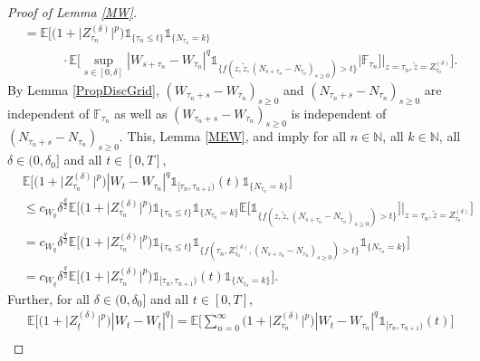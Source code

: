 \documentclass[11pt,a4paper]{article}
\numberwithin{equation}{section}
\theoremstyle{definition}
\newcommand{\E}{{\mathbb{E}}}
\newcommand{\N}{{\mathbb{N}}}
\newcommand{\F}{\mathbb{F}}
\begin{document}
\begin{proof}[Proof of Lemma \ref{MW}]
\begin{equation}
\begin{aligned}
    &= \E\Big[\big(1+ \big|Z^{(\delta)}_{\tau_n}\big|^p\big) \mathds{1}_{\{\tau_n \leq t\}} \mathds{1}_{\{N_{\tau_n} = k\}} \\
    &\quad\quad\quad \cdot\E\Big[ \sup_{s\in[0,\delta]} |W_{s+\tau_n}-W_{\tau_n}|^q  \mathds{1}_{\{f(z,\widetilde z, (N_{s+\tau_n}-N_{\tau_n})_{s\geq 0})> t\}}  \Big| \F_{\tau_n} \Big]\Big|_{z =\tau_n, \widetilde z =Z^{(\delta)}_{\tau_n} } \Big].
    \end{aligned}
\end{equation}
By Lemma \ref{PropDiscGrid}, $(W_{\tau_n+s}- W_{\tau_n})_{s\geq 0}$ and $(N_{\tau_n+s}- N_{\tau_n})_{s\geq 0}$ are independent of $\F_{\tau_n}$ as well as $(W_{\tau_n+s}- W_{\tau_n})_{s\geq 0}$ is independent of $(N_{\tau_n+s}- N_{\tau_n})_{s\geq 0}$. This, Lemma \ref{MEW}, and \cite[p.~33]{Grikhman2004} imply for all $n\in\N$, all $k\in\N$, all $\delta\in(0,\delta_0]$ and all $t\in[0,T]$,
\begin{equation}
    \begin{aligned}\label{MW4a}
    &\E\big[\big(1+ \big|Z^{(\delta)}_{\tau_n}\big|^p\big)   |W_t-W_{\tau_n}|^q \mathds{1}_{[\tau_n,\tau_{n+1})}(t)  \mathds{1}_{\{N_{\tau_n} = k\}} \big]\\
    &\leq c_{W_q} \delta^\frac{q}{2} \E\Big[\big(1+ \big|Z^{(\delta)}_{\tau_n}\big|^p\big) \mathds{1}_{\{\tau_n \leq t\}} \mathds{1}_{\{N_{\tau_n} = k\}} \E\Big[ \mathds{1}_{\{f(z,\widetilde z, (N_{s+\tau_n}-N_{\tau_n})_{s\geq0})> t\}} \Big]\Big|_{z =\tau_n, \widetilde z =Z^{(\delta)}_{\tau_n}} \Big]\\
    &= c_{W_q} \delta^\frac{q}{2} \E\Big[\big(1+ \big|Z^{(\delta)}_{\tau_n}\big|^p\big) \mathds{1}_{\{\tau_n \leq t\}}  \mathds{1}_{\{f(\tau_n,Z^{(\delta)}_{\tau_n}, (N_{s+\tau_n}-N_{\tau_n})_{s\geq0})> t\}} \mathds{1}_{\{N_{\tau_n} = k\}} \Big]\\
    &= c_{W_q} \delta^\frac{q}{2} \E\Big[\big(1+ \big|Z^{(\delta)}_{\tau_n}\big|^p\big) \mathds{1}_{[\tau_n, \tau_{n+1})}(t)  \mathds{1}_{\{N_{\tau_n} = k\}} \Big].
    \end{aligned}
\end{equation}
Further, for all $\delta\in(0,\delta_0]$ and all $t\in[0,T]$,
\begin{equation}
    \begin{aligned}\label{MW5}
    &\E\Big[ \big(1+ \big|Z^{(\delta)}_{\underline{t}}\big|^p\big)   |W_t-W_{\underline{t}}|^q \Big]
    =\E\Big[\sum_{n=0}^\infty \big(1+ \big|Z^{(\delta)}_{\tau_n}\big|^p\big)   |W_t-W_{\tau_n}|^q \mathds{1}_{[\tau_n,\tau_{n+1})}(t) \Big]\\

\end{aligned}
\end{equation}
\end{proof}
\end{document}

